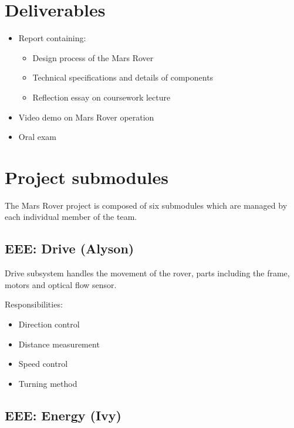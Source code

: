 \documentclass[10pt, a4paper]{article}
\begin{document}
\section{Deliverables}

\begin{itemize}
    \item Report containing:
    \begin{itemize}
        \item Design process of the Mars Rover 
        \item Technical specifications and details of components
        \item Reflection essay on coursework lecture 
    \end{itemize}
    \item Video demo on Mars Rover operation 
    \item Oral exam 
\end{itemize}

\section{Project submodules}

The Mars Rover project is composed of six submodules which are managed by each individual member of the team. 

\subsection{EEE: Drive (Alyson)}

Drive subsystem handles the movement of the rover, parts including the frame, motors and optical flow sensor.

Responsibilities:
\begin{itemize}
    \item Direction control
    \item Distance measurement
    \item Speed control 
    \item Turning method 
\end{itemize}

\subsection{EEE: Energy (Ivy)}
\end{document}

